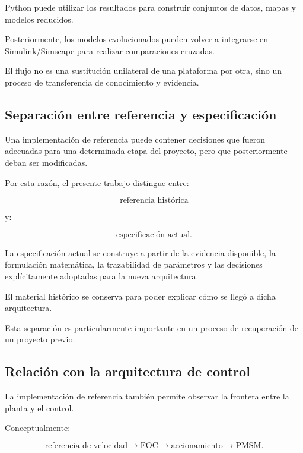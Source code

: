 Python puede utilizar los resultados para construir conjuntos de datos, mapas y modelos reducidos.

Posteriormente, los modelos evolucionados pueden volver a integrarse en Simulink/Simscape para realizar comparaciones cruzadas.

El flujo no es una sustitución unilateral de una plataforma por otra, sino un proceso de transferencia de conocimiento y evidencia.

\subsection{Separación entre referencia y especificación}

Una implementación de referencia puede contener decisiones que fueron adecuadas para una determinada etapa del proyecto, pero que posteriormente deban ser modificadas.

Por esta razón, el presente trabajo distingue entre:

\begin{equation}
\text{referencia histórica}
\end{equation}

y:

\begin{equation}
\text{especificación actual}.
\end{equation}

La especificación actual se construye a partir de la evidencia disponible, la formulación matemática, la trazabilidad de parámetros y las decisiones explícitamente adoptadas para la nueva arquitectura.

El material histórico se conserva para poder explicar cómo se llegó a dicha arquitectura.

Esta separación es particularmente importante en un proceso de recuperación de un proyecto previo.

\subsection{Relación con la arquitectura de control}

La implementación de referencia también permite observar la frontera entre la planta y el control.

Conceptualmente:

\begin{equation}
\text{referencia de velocidad}
\rightarrow
\text{FOC}
\rightarrow
\text{accionamiento}
\rightarrow
\text{PMSM}.
\end{equation}

